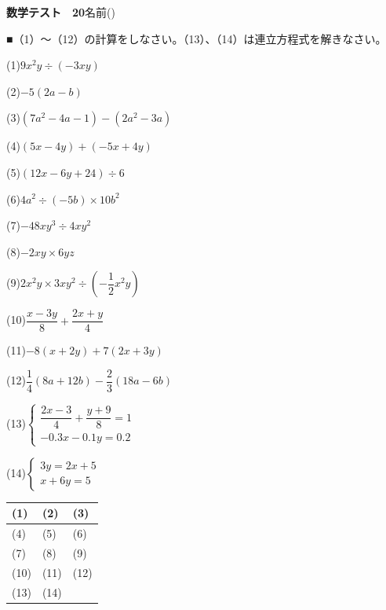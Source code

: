 \documentclass[a4paper,11pt]{ltjsarticle}
\newlength{\qcol}\setlength{\qcol}{0.47\textwidth}
\newlength{\qgap}
\newlength{\anscolw}\setlength{\anscolw}{0.30\textwidth}
\newlength{\ansh}
\newcommand{\Q}[2]{\parbox[t]{\qcol}{\raggedright (#1)\hspace{0.6em}$\displaystyle #2$}}
\newcommand{\QR}[4]{\Q{#1}{#2}\hfill\Q{#3}{#4}\par\vspace{\qgap}}
\newcommand{\anscell}[1]{\rule[-\ansdrop]{0pt}{\ansh}(#1)}
\newlength{\ansdrop}
\begin{document}
{\large\bfseries 数学テスト　20}\hfill 名前(\underline{\hspace{32mm}})\par\vspace{3mm}
■（1）〜（12）の計算をしなさい。（13）、（14）は連立方程式を解きなさい。\par\vspace{3mm}
\setlength{\qgap}{11mm}
\QR{1}{9x^2y\div(-3xy)}{2}{-5(2a-b)}
\QR{3}{(7a^2-4a-1)-(2a^2-3a)}{4}{(5x-4y)+(-5x+4y)}
\QR{5}{(12x-6y+24)\div6}{6}{4a^2\div(-5b)\times10b^2}
\QR{7}{-48xy^3\div4xy^2}{8}{-2xy\times6yz}
\QR{9}{2x^2y\times3xy^2\div\left(-\dfrac{1}{2}x^2y\right)}{10}{\dfrac{x-3y}{8}+\dfrac{2x+y}{4}}
\QR{11}{-8(x+2y)+7(2x+3y)}{12}{\dfrac{1}{4}(8a+12b)-\dfrac{2}{3}(18a-6b)}
\QR{13}{\left\{\begin{array}{l} \dfrac{2x-3}{4}+\dfrac{y+9}{8}=1 \\ -0.3x-0.1y=0.2 \end{array}\right.}{14}{\left\{\begin{array}{l} 3y=2x+5 \\ x+6y=5 \end{array}\right.}
\vfill
\setlength{\ansh}{12mm}\setlength{\ansdrop}{8mm}%
\begin{center}\begin{tabular}{|p{\anscolw}|p{\anscolw}|p{\anscolw}|}\hline
\anscell{1} & \anscell{2} & \anscell{3} \\\hline
\anscell{4} & \anscell{5} & \anscell{6} \\\hline
\anscell{7} & \anscell{8} & \anscell{9} \\\hline
\anscell{10} & \anscell{11} & \anscell{12} \\\hline
\anscell{13} & \anscell{14} &  \\\hline
\end{tabular}\end{center}
\end{document}
